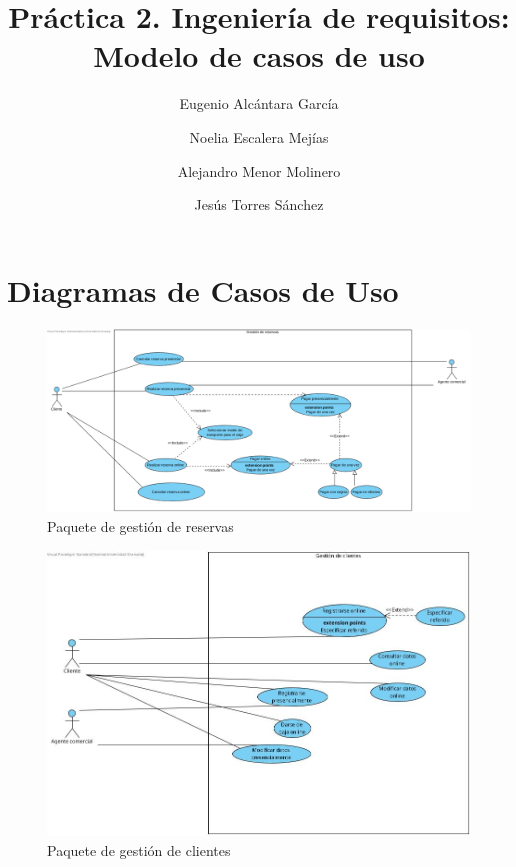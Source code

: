 \documentclass{article}
\title{Práctica 2. Ingeniería de requisitos: Modelo de casos de uso}
\author{Eugenio Alcántara García\\
		\and Noelia Escalera Mejías\\
		\and Alejandro Menor Molinero\\
		\and Jesús Torres Sánchez}
\begin{document}
	\maketitle
	
	\section{Diagramas de Casos de Uso}
	
	\begin{figure}[H]
		\centering
		\includegraphics[totalheight=7cm]{Gestion_reservas}
		\caption{Paquete de gestión de reservas}
		\label{fig:gestion_reservas}
	\end{figure}

	\begin{figure}[H]
		\centering
		\includegraphics[totalheight=7cm]{Gestion_clientes}
		\caption{Paquete de gestión de clientes}
		\label{fig:gestion_clientes}
	\end{figure}
\end{document}
